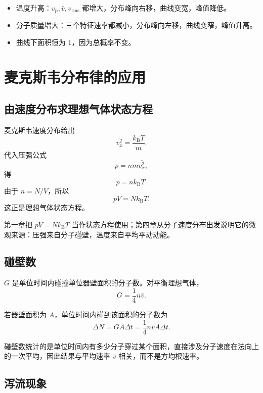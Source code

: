 \begin{KeyBox}[曲线变化规律]
\begin{itemize}
  \item 温度升高：\(v_{\mathrm p},\bar v,v_{\mathrm{rms}}\) 都增大，分布峰向右移，曲线变宽，峰值降低。
  \item 分子质量增大：三个特征速率都减小，分布峰向左移，曲线变窄，峰值升高。
  \item 曲线下面积恒为 \(1\)，因为总概率不变。
\end{itemize}
\end{KeyBox}

\section{麦克斯韦分布律的应用}

\subsection{由速度分布求理想气体状态方程}

麦克斯韦速度分布给出
\[
  \overline{v_x^2}=\frac{k_{\mathrm B}T}{m}.
\]
代入压强公式
\[
  p=nm\overline{v_x^2},
\]
得
\[
  p=nk_{\mathrm B}T.
\]
由于 \(n=N/V\)，所以
\[
  pV=Nk_{\mathrm B}T.
\]
这正是理想气体状态方程。

\begin{KeyBox}[这一步的意义]
第一章把 \(pV=Nk_{\mathrm B}T\) 当作状态方程使用；第四章从分子速度分布出发说明它的微观来源：压强来自分子碰壁，温度来自平均平动动能。
\end{KeyBox}

\subsection{碰壁数}

 \(G\) 是单位时间内碰撞单位器壁面积的分子数。对平衡理想气体，
\[
  \boxed{
  G=\frac14 n\bar v
  }.
\]

若器壁面积为 \(A\)，单位时间内碰到该面积的分子数为
\[
  \Delta N=GA\Delta t
  =
  \frac14 n\bar v A\Delta t.
\]

\begin{WarnBox}
碰壁数统计的是单位时间内有多少分子穿过某个面积，直接涉及分子速度在法向上的一次平均，因此结果与平均速率 \(\bar v\) 相关，而不是方均根速率。
\end{WarnBox}

\subsection{泻流现象}

